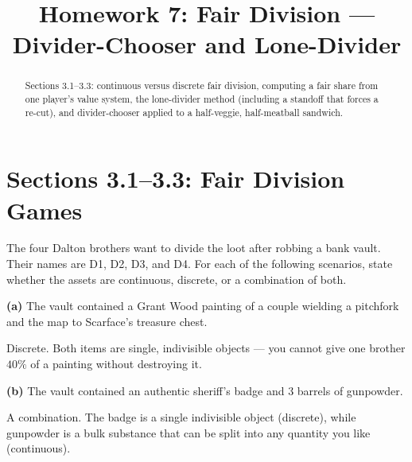 \documentclass[12pt]{ximera}
\title{Homework 7: Fair Division --- Divider-Chooser and Lone-Divider}
\begin{document}
\begin{abstract}
Sections 3.1--3.3: continuous versus discrete fair division, computing a fair share
from one player's value system, the lone-divider method (including a standoff that
forces a re-cut), and divider-chooser applied to a half-veggie, half-meatball
sandwich.
\end{abstract}
\maketitle

\section*{Sections 3.1--3.3: Fair Division Games}

\begin{problem}
The four Dalton brothers want to divide the loot after robbing a bank vault. Their
names are D1, D2, D3, and D4. For each of the following scenarios, state whether the
assets are continuous, discrete, or a combination of both.

\begin{prompt}
\textbf{(a)} The vault contained a Grant Wood painting of a couple wielding a pitchfork
and the map to Scarface's treasure chest.

\begin{multipleChoice}
\end{multipleChoice}

\begin{feedback}
Discrete. Both items are single, indivisible objects --- you cannot give one brother
$40\%$ of a painting without destroying it.
\end{feedback}
\end{prompt}

\begin{prompt}
\textbf{(b)} The vault contained an authentic sheriff's badge and $3$ barrels of
gunpowder.

\begin{multipleChoice}
\end{multipleChoice}

\begin{feedback}
A combination. The badge is a single indivisible object (discrete), while gunpowder
is a bulk substance that can be split into any quantity you like (continuous).
\end{feedback}
\end{prompt}


\end{problem}
\end{document}
